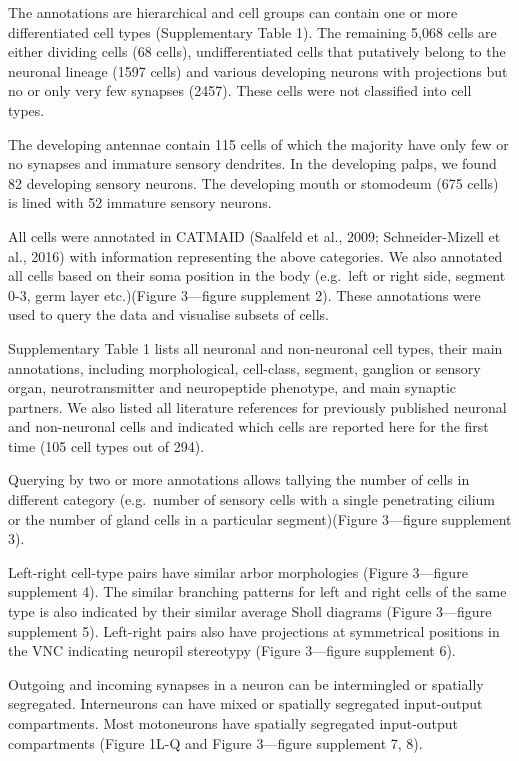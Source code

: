 \documentclass[
  11pt,
]{article}
\begin{document}
The annotations are hierarchical and cell groups can contain one or more
differentiated cell types (Supplementary Table 1). The remaining 5,068
cells are either dividing cells (68 cells), undifferentiated cells that
putatively belong to the neuronal lineage (1597 cells) and various
developing neurons with projections but no or only very few synapses
(2457). These cells were not classified into cell types.

The developing antennae contain 115 cells of which the majority have
only few or no synapses and immature sensory dendrites. In the
developing palps, we found 82 developing sensory neurons. The developing
mouth or stomodeum (675 cells) is lined with 52 immature sensory
neurons.

All cells were annotated in CATMAID (Saalfeld et al., 2009;
Schneider-Mizell et al., 2016) with information representing the above
categories. We also annotated all cells based on their soma position in
the body (e.g.~left or right side, segment 0-3, germ layer etc.)(Figure
3---figure supplement 2). These annotations were used to query the data
and visualise subsets of cells.

Supplementary Table 1 lists all neuronal and non-neuronal cell types,
their main annotations, including morphological, cell-class, segment,
ganglion or sensory organ, neurotransmitter and neuropeptide phenotype,
and main synaptic partners. We also listed all literature references for
previously published neuronal and non-neuronal cells and indicated which
cells are reported here for the first time (105 cell types out of 294).

Querying by two or more annotations allows tallying the number of cells
in different category (e.g.~number of sensory cells with a single
penetrating cilium or the number of gland cells in a particular
segment)(Figure 3---figure supplement 3).

Left-right cell-type pairs have similar arbor morphologies (Figure
3---figure supplement 4). The similar branching patterns for left and
right cells of the same type is also indicated by their similar average
Sholl diagrams (Figure 3---figure supplement 5). Left-right pairs also
have projections at symmetrical positions in the VNC indicating neuropil
stereotypy (Figure 3---figure supplement 6).

Outgoing and incoming synapses in a neuron can be intermingled or
spatially segregated. Interneurons can have mixed or spatially
segregated input-output compartments. Most motoneurons have spatially
segregated input-output compartments (Figure 1L-Q and Figure 3---figure
supplement 7, 8).
\end{document}
